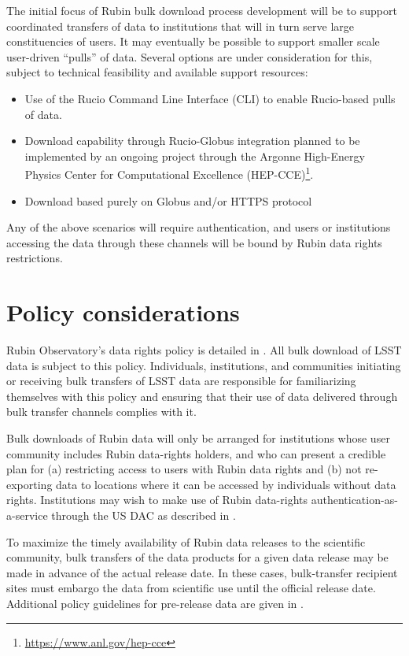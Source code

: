 The initial focus of Rubin bulk download process development will be to support coordinated transfers of data to institutions that will in turn serve large constituencies of users. It may eventually be possible to support smaller scale user-driven ``pulls'' of data. Several options are under consideration for this, subject to technical feasibility and available support resources:
\begin{itemize}
\item Use of the Rucio Command Line Interface (CLI) to enable Rucio-based pulls of data.
\item Download capability through Rucio-Globus integration planned to be implemented by an ongoing project through the Argonne High-Energy Physics Center for Computational Excellence (HEP-CCE)\footnote{\url{https://www.anl.gov/hep-cce}}.
\item Download based purely on Globus and/or HTTPS protocol
\end{itemize}
Any of the above scenarios will require authentication, and users or institutions accessing the data through these channels will be bound by Rubin data rights restrictions.

\section{Policy considerations}

Rubin Observatory's data rights policy is detailed in . All bulk download of LSST data is subject to this policy. Individuals, institutions, and communities initiating or receiving bulk transfers of LSST data are responsible for familiarizing themselves with this policy and ensuring that their use of data delivered through bulk transfer channels complies with it.

Bulk downloads of Rubin data will only be arranged for institutions whose user community includes Rubin data-rights holders, and who can present a credible plan for (a) restricting access to users with Rubin data rights and (b) not re-exporting data to locations where it can be accessed by individuals without data rights. Institutions may wish to make use of Rubin data-rights authentication-as-a-service through the US DAC as described in .

To maximize the timely availability of Rubin data releases to the scientific community, bulk transfers of the data products for a given data release may be made in advance of the actual release date. In these cases, bulk-transfer recipient sites must embargo the data from scientific use until the official release date. Additional policy guidelines for pre-release data are given in .

